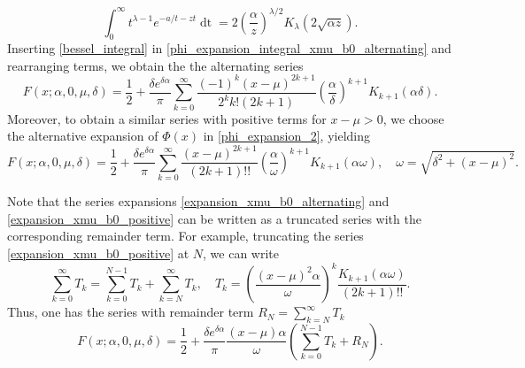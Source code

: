 \documentclass[10pt,a4paper,oneside]{article}
\numberwithin{equation}{section}
\begin{document}
\begin{equation}\label{bessel_integral}
\int_0^{\infty} t^{\lambda - 1}e^{-a/t - zt} \mathop{dt} = 2\left(\frac{\alpha}{z}\right)^{\lambda/2} K_{\lambda}(2\sqrt{\alpha z}).
\end{equation}
Inserting \eqref{bessel_integral} in \eqref{phi_expansion_integral_xmu_b0_alternating} and rearranging terms, we obtain the the alternating series
\begin{equation}\label{expansion_xmu_b0_alternating}
F(x; \alpha, 0, \mu, \delta) = \frac{1}{2} + \frac{\delta e^{\delta \alpha}}{\pi}\sum_{k=0}^{\infty} \frac{(-1)^k (x-\mu)^{2k+1}}{2^k k! (2k + 1)} \left(\frac{\alpha}{\delta}\right)^{k+1}K_{k+1}(\alpha \delta).
\end{equation}
Moreover, to obtain a similar series with positive terms for $x - \mu > 0$, we choose the alternative expansion of $\Phi(x)$ in \eqref{phi_expansion_2}, yielding
\begin{equation}\label{expansion_xmu_b0_positive}
F(x; \alpha, 0, \mu, \delta) = \frac{1}{2} + \frac{\delta e^{\delta \alpha}} {\pi}\sum_{k=0}^{\infty} \frac{(x-\mu)^{2k+1}}{(2k +1)!!} \left(\frac{\alpha}{\omega}\right)^{k+1}K_{k+1}(\alpha \omega), \quad \omega = \sqrt{\delta^2 + (x-\mu)^2}.
\end{equation}

Note that the series expansions \eqref{expansion_xmu_b0_alternating} and \eqref{expansion_xmu_b0_positive} can be written as a truncated series with the corresponding remainder term. For example, truncating the series \eqref{expansion_xmu_b0_positive} at $N$, we can write
\begin{equation}\label{expansion_xmu_b0_positive_error_term}
\sum_{k=0}^{\infty} T_k = \sum_{k=0}^{N-1} T_k + \sum_{k=N}^{\infty}T_k, \quad T_k = \left(\frac{(x-\mu)^2 \alpha}{\omega}\right)^k \frac{K_{k+1}(\alpha \omega)}{(2k +1)!!}.
\end{equation}
Thus, one has the series with remainder term $R_N = \sum_{k=N}^{\infty}T_k$
\begin{equation}\label{expansion_xmu_b0_positive_with_remainder}
F(x; \alpha, 0, \mu, \delta) = \frac{1}{2} + \frac{\delta e^{\delta \alpha}}{\pi}\frac{(x-\mu)\alpha}{\omega}\left(\sum_{k=0}^{N-1}T_k + R_N\right).
\end{equation}
\end{document}
